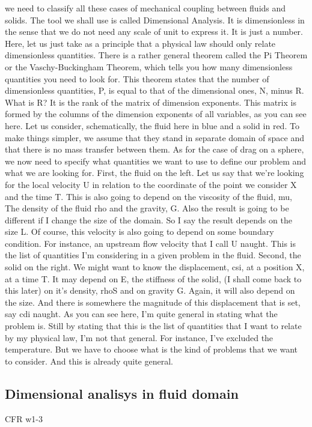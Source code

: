 we need to classify all these cases of mechanical coupling between fluids and solids. 
The tool we shall use is called Dimensional Analysis.
It is dimensionless in the sense that we do not need any scale of unit to express it. It is just a number.
Here, let us just take as a principle that a physical law should only relate dimensionless quantities.
There is a rather general
theorem called the Pi Theorem or the Vaschy-Buckingham Theorem, which tells you how many dimensionless
quantities you need to look for. This theorem states that the number
of dimensionless quantities, P, is equal to that of
the dimensional ones, N, minus R. What is R? It is the rank of the matrix
of dimension exponents. This matrix is formed by the columns of
the dimension exponents of all variables, as you can see here.
Let us consider, schematically,
the fluid here in blue and a solid in red. To make things simpler, we assume that
they stand in separate domain of space and that there is no mass
transfer between them. As for the case of drag on a sphere,
we now need to specify what quantities we want to use to define
our problem and what we are looking for. First, the fluid on the left. Let us say that we're looking for
the local velocity U in relation to the coordinate of the point
we consider X and the time T. This is also going to depend on
the viscosity of the fluid, mu, The density of the fluid rho and
the gravity, G. Also the result is going to be different
if I change the size of the domain. So I say the result depends on the size L. Of course, this velocity is also going to
depend on some boundary condition. For instance, an upstream flow
velocity that I call U naught. This is the list of quantities I'm
considering in a given problem in the fluid. Second, the solid on the right. We might want to know the displacement,
csi, at a position X, at a time T. It may depend on E,
the stiffness of the solid, (I shall come back to this later) on it's density, rhoS and on gravity G. Again, it will also depend on the size. And there is somewhere the magnitude of this displacement that is set,
say cdi naught. As you can see here,
I'm quite general in stating what the problem is. Still by stating that this is
the list of quantities that I want to relate by my physical law,
I'm not that general. For instance,
I've excluded the temperature. But we have to choose what is the kind of
problems that we want to consider. And this is already quite general.

\subsection{Dimensional analisys in fluid domain}
\label{key}
CFR w1-3

